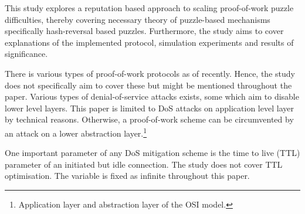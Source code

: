 This study explores a reputation based approach to scaling proof-of-work puzzle difficulties, thereby covering necessary theory of puzzle-based mechanisms specifically hash-reversal based puzzles. Furthermore, the study aims to cover explanations of the implemented protocol, simulation experiments and results of significance. 

There is various types of proof-of-work protocols as of recently. Hence, the study does not specifically aim to cover these but might be mentioned throughout the paper. Various types of denial-of-service attacks exists, some which aim to disable lower level layers. This paper is limited to DoS attacks on application level layer by technical reasons. Otherwise, a proof-of-work scheme can be circumvented by an attack on a lower abstraction layer.\footnote{Application layer and abstraction layer of the OSI model.}

One important parameter of any DoS mitigation scheme is the time to live (TTL) parameter of an initiated but idle connection. The study does not cover TTL optimisation. The variable is fixed as infinite throughout this paper.
\begin{comment}


Scope: \\
The coverage of this study ..... \\
The study consists of ..... \\
The study covers the ..... \\
This study is focus on ..... \\

Delimitations: \\
The study does not cover the ..... \\
The researcher limited this research to ..... \\
This study is limited to .....


\end{comment}